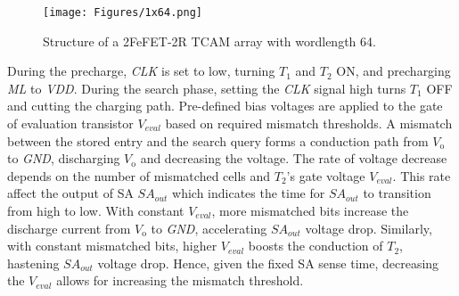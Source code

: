 

\label{sec:2FeFET-2R TCAM Array}

\begin{figure}
    \centering    
    \texttt{[image: Figures/1x64.png]}
    \caption{Structure of a 2FeFET-2R TCAM array with wordlength 64.}
\label{fig:1x64}
\end{figure}

During the precharge, \textit{CLK} is set to low, turning  $\textit{T}_\text{1}$ and $\textit{T}_\text{2}$ ON, and precharging \textit{ML} to \textit{VDD}.
During the search phase, setting the \textit{CLK} signal high turns $\textit{T}_\text{1}$ OFF and cutting the charging path. 
Pre-defined bias voltages are applied to the gate of evaluation transistor  $\textit{V}_\textit{eval}$ based on required mismatch thresholds. 
A mismatch between the stored entry and the search query forms a conduction path from $\textit{V}_\text{o}$ to \textit{GND}, discharging $\textit{V}_\text{o}$ and decreasing the voltage.
The rate of voltage decrease depends on the number of mismatched cells and $\textit{T}_\text{2}$'s gate voltage $\textit{V}_\textit{eval}$. 
This rate affect  the output of SA $\textit{SA}_\textit{out}$ which indicates the time for $\textit{SA}_\textit{out}$ to transition from high to low. 
With constant $\textit{V}_\textit{eval}$, more mismatched bits increase the discharge current from $\textit{V}_\text{o}$ to \textit{GND}, accelerating $\textit{SA}_\textit{out}$ voltage drop. 
Similarly, with constant mismatched bits, higher $\textit{V}_\textit{eval}$ boosts the conduction of $\textit{T}_\text{2}$, hastening $\textit{SA}_\textit{out}$ voltage drop. Hence, given the fixed SA sense time, decreasing the $\textit{V}_\textit{eval}$ allows for increasing the mismatch threshold.

